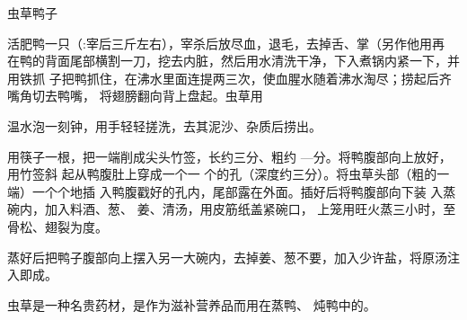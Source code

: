 \begin{recipe}{虫草鸭子}

\ingredients


\cooking

\step 活肥鸭一只（:宰后三斤左右），宰杀后放尽血，退毛，去掉舌、掌（另作他用再
在鸭的背面尾部横割一刀，挖去内脏，然后用水清洗干净，下入煮锅内紧一下，并用铁抓
子把鸭抓住，在沸水里面连提两三次，使血腥水随着沸水淘尽；捞起后齐嘴角切去鸭嘴，
将翅膀翻向背上盘起。虫草用

温水泡一刻钟，用手轻轻搓洗，去其泥沙、杂质后捞出。

用筷子一根，把一端削成尖头竹签，长约三分、粗约 —分。将鸭腹部向上放好，用竹签斜
起从鸭腹肚上穿成一个一 个的孔（深度约三分）。将虫草头部（粗的一端）一个个地插
入鸭腹戳好的孔内，尾部露在外面。插好后将鸭腹部向下装 入蒸碗内，加入料酒、葱、
姜、清汤，用皮筋纸盖紧碗口， 上笼用旺火蒸三小时，至骨松、翅裂为度。

\step 蒸好后把鸭子腹部向上摆入另一大碗内，去掉姜、葱不要，加入少许盐，将原汤注
入即成。

\features

虫草是一种名贵药材，是作为滋补营养品而用在蒸鸭、 炖鸭中的。

\end{recipe}

